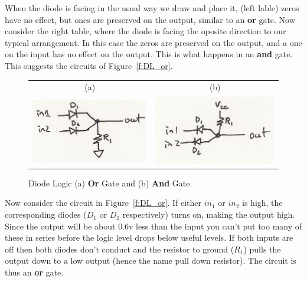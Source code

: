 When the diode is facing in the usual way we draw and place it, (left lable) zeros have no effect, but ones are preserved on the output, similar to an \textbf{or} gate. Now consider the right table, where the diode is facing the oposite direction to our typical arrangement.  In this case the zeros are preserved on the output, and a one on the input has no effect on the output.  This is what happens in an \textbf{and} gate.  This suggests the circuits of Figure~\ref{f:DL_or}.

\begin{figure}
\begin{center}
\caption{Diode Logic  (a) \textbf{Or} Gate\label{f:DL_or} and (b) \textbf{And} Gate.}\label{f:DL_and}
\begin{tabular}{cc}
(a) & (b) \\
\includegraphics{images/DLor.eps}&\includegraphics{images/DLand.eps}\\
\end{tabular}
\end{center}
\end{figure}

Now consider the circuit in Figure~\ref{f:DL_or}.  If either $in_1$ or $in_2$ is high, the corresponding diodes ($D_1$ or $D_2$ respectively) turns on, making the output high.  Since the output will be about 0.6v less than the input you can't put too many of these in series before the logic level drops below useful levels.  If both inputs are off then both diodes don't conduct and the resistor to ground ($R_1$) pulls the output down to a low output (hence the name pull down resistor).  The circuit is thus an \textbf{or} gate.

